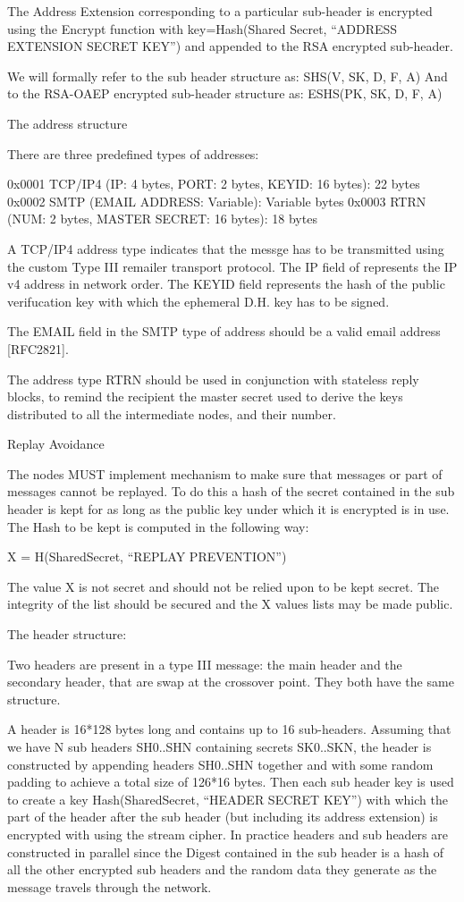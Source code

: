 The Address Extension corresponding to a particular sub-header is
encrypted using the Encrypt function with key=Hash(Shared Secret,
``ADDRESS EXTENSION SECRET KEY'') and appended to the RSA encrypted
sub-header.

We will formally refer to the sub header structure as:
SHS(V, SK, D, F, A)
And to the RSA-OAEP encrypted sub-header structure as:
ESHS(PK, SK, D, F, A)

The address structure

There are three predefined types of addresses:

0x0001 TCP/IP4 (IP: 4 bytes, PORT: 2 bytes, KEYID: 16 bytes): 22 bytes
0x0002 SMTP   (EMAIL ADDRESS: Variable): Variable bytes
0x0003 RTRN   (NUM: 2 bytes, MASTER SECRET: 16 bytes): 18 bytes

A TCP/IP4 address type indicates that the messge has to be transmitted
using the custom Type III remailer transport protocol. The IP field of
represents the IP v4 address in network order. The KEYID field
represents the hash of the public verifucation key with which the
ephemeral D.H. key has to be signed.

The EMAIL field in the SMTP type of address should be a valid email
address [RFC2821].

The address type RTRN should be used in conjunction with stateless
reply blocks, to remind the recipient the master secret used to
derive the keys distributed to all the intermediate nodes, and their
number.

Replay Avoidance

The nodes MUST implement mechanism to make sure that messages or part
of messages cannot be replayed. To do this a hash of the secret
contained in the sub header is kept for as long as the public key
under which it is encrypted is in use. The Hash to be kept is computed
in the following way:

X = H(SharedSecret, ``REPLAY PREVENTION'')

The value X is not secret and should not be relied upon to be kept
secret. The integrity of the list should be secured and the X values
lists may be made public.

The header structure:

Two headers are present in a type III message: the main header and the
secondary header, that are swap at the crossover point. They both have
the same structure. 

A header is 16*128 bytes long and contains up to 16
sub-headers. Assuming that we have N sub headers SH0..SHN containing
secrets SK0..SKN, the header is constructed by appending headers
SH0..SHN together and with some random padding to achieve a total size
of 126*16 bytes. Then each sub header key is used to create a key
Hash(SharedSecret, ``HEADER SECRET KEY'') with which the part of the
header after the sub header (but including its address extension) is
encrypted with using the stream cipher. 
In practice headers and sub headers are constructed in parallel since
the Digest contained in the sub header is a hash of all the other
encrypted sub headers and the random data they generate as the message
travels through the network. 

